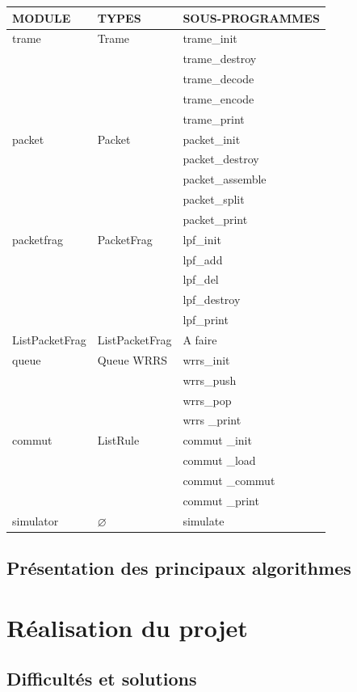 \documentclass[a4paper,11pt]{article}
\begin{document}
\begin{center}
\begin{tabular}{|l|l|l|}\hline
MODULE & TYPES & SOUS-PROGRAMMES\\\hline
trame & Trame & trame\_init\\
 &  & trame\_destroy\\
 &  & trame\_decode\\
 &  & trame\_encode\\
 &  & trame\_print\\\hline
packet & Packet & packet\_init\\
 &  & packet\_destroy\\
 &  & packet\_assemble\\
 &  & packet\_split\\
 &  & packet\_print\\\hline
packetfrag & PacketFrag & lpf\_init\\
 &  & lpf\_add\\
 &  & lpf\_del\\
 &  & lpf\_destroy\\
 &  & lpf\_print\\\hline
ListPacketFrag & ListPacketFrag & A faire \\\hline %
queue & Queue WRRS & wrrs\_init\\
 &  & wrrs\_push\\
 &  & wrrs\_pop\\
 &  & wrrs \_print\\\hline
commut & ListRule & commut \_init\\
 &  & commut \_load\\
 &  & commut \_commut\\
 &  & commut \_print\\\hline
simulator & $\varnothing$ & simulate\\\hline
\end{tabular}
\end{center}

\subsection{Présentation des principaux algorithmes}


\section{Réalisation du projet}

\subsection{Difficultés et solutions}
\end{document}
